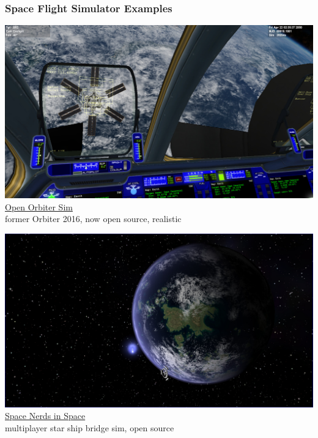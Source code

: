\documentclass[aspectratio=169,11pt,xcolor=dvipsnames]{beamer}
\begin{document}
\begin{frame}
  \frametitle{Space Flight Simulator Examples}
  \begin{minipage}[t]{0.49\textwidth}
    \begin{center}
      \includegraphics[width=\textwidth]{orbiter}\\
      \href{https://openorbiter.space/}{Open Orbiter Sim}\\
      former Orbiter 2016, now open source, realistic
    \end{center}
  \end{minipage}
  \begin{minipage}[t]{0.49\textwidth}
    \begin{center}
      \includegraphics[width=\textwidth]{nerds}\\
      \href{https://smcameron.github.io/space-nerds-in-space/}{Space Nerds in Space}\\
      multiplayer star ship bridge sim, open source
    \end{center}
  \end{minipage}
\end{frame}
\end{document}
